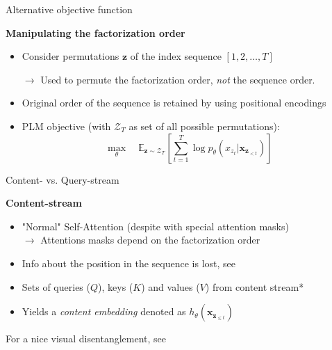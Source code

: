 
\begin{frame}{Alternative objective function}

\vfill
	
	\textbf{Manipulating the factorization order}
	
	\begin{itemize}
		\item Consider permutations $\mathbf{z}$ of the index sequence $[1,2, \hdots, T]$
		\item[$\to$] Used to permute the factorization order, \textit{not} the sequence order.
		\item Original order of the sequence is retained by using positional encodings
		\item PLM objective (with $\mathcal{Z}_T$ as set of all possible permutations):
					$$\max_{\theta} \quad \mathds{E}_{\mathbf{z}\sim\mathcal{Z}_T} \left[ \sum_{t=1}^{T} \log p_\theta (x_{z_t} | \mathbf{x}_{\mathbf{z}_{< t}}) \right]$$
	\end{itemize}
	
\vfill

\end{frame}


\begin{frame}{Content- vs. Query-stream}

\vfill

	\textbf{Content-stream}
	
	\begin{itemize}
		\item "Normal" Self-Attention (despite with special attention masks)\\
					$\rightarrow$ Attentions masks depend on the factorization order
		\item Info about the position in the sequence is lost, see \href{https://arxiv.org/pdf/1906.08237.pdf}{}
		\item Sets of queries ($Q$), keys ($K$) and values ($V$) from content stream*
		\item Yields a \textit{content embedding} denoted as $h_{\theta}(\mathbf{x}_{\mathbf{z}_{\leq t}})$
	\end{itemize}
	
	{\footnotesize *For a nice visual disentanglement, see \href{https://arxiv.org/pdf/1906.08237.pdf}{}}
	
\vfill

\end{frame}

